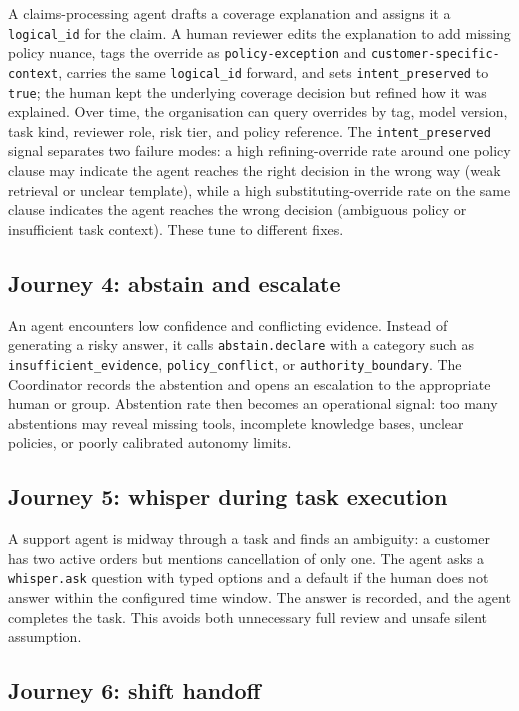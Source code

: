 \documentclass[11pt]{article}
\begin{document}
A claims-processing agent drafts a coverage explanation and assigns it a \texttt{logical\_id} for the claim. A human reviewer edits the explanation to add missing policy nuance, tags the override as \texttt{policy-exception} and \texttt{customer-specific-context}, carries the same \texttt{logical\_id} forward, and sets \texttt{intent\_preserved} to \texttt{true}; the human kept the underlying coverage decision but refined how it was explained. Over time, the organisation can query overrides by tag, model version, task kind, reviewer role, risk tier, and policy reference. The \texttt{intent\_preserved} signal separates two failure modes: a high refining-override rate around one policy clause may indicate the agent reaches the right decision in the wrong way (weak retrieval or unclear template), while a high substituting-override rate on the same clause indicates the agent reaches the wrong decision (ambiguous policy or insufficient task context). These tune to different fixes.

\subsection{Journey 4: abstain and escalate}

An agent encounters low confidence and conflicting evidence. Instead of generating a risky answer, it calls \texttt{abstain.declare} with a category such as \texttt{insufficient\_evidence}, \texttt{policy\_conflict}, or \texttt{authority\_boundary}. The Coordinator records the abstention and opens an escalation to the appropriate human or group. Abstention rate then becomes an operational signal: too many abstentions may reveal missing tools, incomplete knowledge bases, unclear policies, or poorly calibrated autonomy limits.

\subsection{Journey 5: whisper during task execution}

A support agent is midway through a task and finds an ambiguity: a customer has two active orders but mentions cancellation of only one. The agent asks a \texttt{whisper.ask} question with typed options and a default if the human does not answer within the configured time window. The answer is recorded, and the agent completes the task. This avoids both unnecessary full review and unsafe silent assumption.

\subsection{Journey 6: shift handoff}
\end{document}
